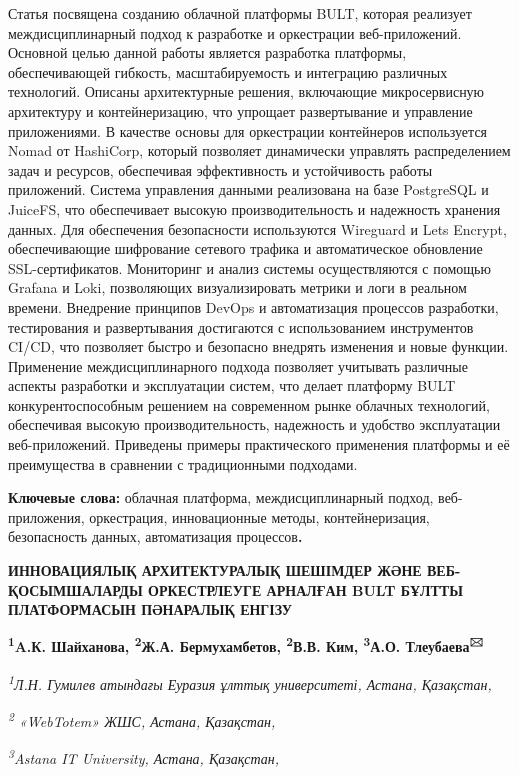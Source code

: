 \documentclass[
]{article}
\begin{document}
Статья посвящена созданию облачной платформы BULT, которая реализует
междисциплинарный подход к разработке и оркестрации веб-приложений.
Основной целью данной работы является разработка платформы,
обеспечивающей гибкость, масштабируемость и интеграцию различных
технологий. Описаны архитектурные решения, включающие микросервисную
архитектуру и контейнеризацию, что упрощает развертывание и управление
приложениями. В качестве основы для оркестрации контейнеров используется
Nomad от HashiCorp, который позволяет динамически управлять
распределением задач и ресурсов, обеспечивая эффективность и
устойчивость работы приложений. Система управления данными реализована
на базе PostgreSQL и JuiceFS, что обеспечивает высокую
производительность и надежность хранения данных. Для обеспечения
безопасности используются Wireguard и Let\textquotesingle s Encrypt,
обеспечивающие шифрование сетевого трафика и автоматическое обновление
SSL-сертификатов. Мониторинг и анализ системы осуществляются с помощью
Grafana и Loki, позволяющих визуализировать метрики и логи в реальном
времени. Внедрение принципов DevOps и автоматизация процессов
разработки, тестирования и развертывания достигаются с использованием
инструментов CI/CD, что позволяет быстро и безопасно внедрять изменения
и новые функции. Применение междисциплинарного подхода позволяет
учитывать различные аспекты разработки и эксплуатации систем, что делает
платформу BULT конкурентоспособным решением на современном рынке
облачных технологий, обеспечивая высокую производительность, надежность
и удобство эксплуатации веб-приложений. Приведены примеры практического
применения платформы и её преимущества в сравнении с традиционными
подходами.

\textbf{Ключевые слова:} облачная платформа, междисциплинарный подход,
веб-приложения, оркестрация, инновационные методы, контейнеризация,
безопасность данных, автоматизация процессов\textbf{.}

\textbf{ИННОВАЦИЯЛЫҚ АРХИТЕКТУРАЛЫҚ ШЕШІМДЕР ЖӘНЕ ВЕБ-ҚОСЫМШАЛАРДЫ
ОРКЕСТРЛЕУГЕ АРНАЛҒАН BULT БҰЛТТЫ ПЛАТФОРМАСЫН ПӘНАРАЛЫҚ ЕНГІЗУ}

\textbf{\textsuperscript{1}A.К. Шайханова, \textsuperscript{2}Ж.А.
Бермухамбетов, \textsuperscript{2}В.В. Ким, \textsuperscript{3}А.О.
Тлеубаева\textsuperscript{🖂}}

\emph{\textsuperscript{1}Л.Н. Гумилев атындағы Еуразия ұлттық
университеті, Астана, Қазақстан,}

\emph{\textsuperscript{2} «WebTotem» ЖШС, Астана, Қазақстан,}

\emph{\textsuperscript{3}Astana IT University, Астана, Қазақстан,}
\end{document}
